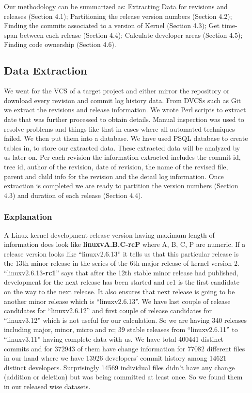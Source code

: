 \documentclass{acm_proc_article-sp}
\begin{document}
Our methodology can be summarized as: Extracting Data for revisions and releases (Section 4.1); Partitioning the release version numbers (Section 4.2); Finding the commits associated to a version of Kernel (Section 4.3); Get time-span between each release (Section 4.4); Calculate developer areas (Section 4.5); Finding code ownership (Section 4.6).

\subsection{Data Extraction}
We went for the VCS of a target project and either mirror the repository or download every revision and commit log history data. From DVCSs such as Git we extract the revisions and release information. We wrote Perl scripts to extract date that was further processed to obtain details. Manual inspection was used to resolve problems and things like that in cases where all automated techniques failed.
We then put them into a database. We have used PSQL database to create tables in, to store our extracted data. These extracted data will be analyzed by us later on. Per each revision the information extracted includes the commit id, tree id, author of the revision, date of revision, the name of the revised file, parent and child info for the revision and the detail log information. Once extraction is completed we are ready to partition the version numbers (Section 4.3) and duration  of each release (Section 4.4).

\subsubsection{Explanation}
A Linux kernel development release version having maximum length of information does look like \textbf{linuxvA.B.C-rcP} where A, B, C, P are numeric. If a release version looks like ``linuxv2.6.13'' it tells us that this particular release is the 13th minor release in the series of the 6th major release of kernel version 2. ``linuxv2.6.13\textbf{-rc1}'' says that after the 12th stable minor release had published, development for the next release has been started and rc1 is the first candidate on the way to the next release. It also ensures that next release is going to be another minor release which is ``linuxv2.6.13''. We have last couple of release candidates for ``linuxv2.6.12'' and first couple of release candidates for ``linuxv3.12'' which is not useful for our calculation. So we are having 340 releases including major, minor, micro and rc; 39 stable releases from ``linuxv2.6.11'' to ``linuxv3.11'' having complete data with us. We have total 400441 distinct commits and for 372943 of them have change information for 77082 different files in our hand where we have 13926 developers' commit history among 14621 distinct developers. Surprisingly 14569 individual files didn't have any change (addition or deletion) but was being committed at least once. So we found them in our released wise datasets.
\end{document}
